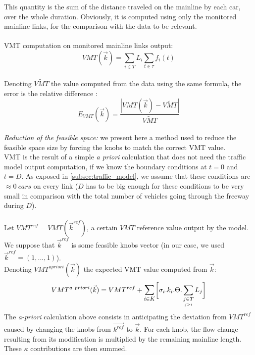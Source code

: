 This quantity is the sum of the distance traveled on the mainline by each car, over the whole duration.
Obviously, it is computed using only the monitored mainline links, for the comparison with the data to be relevant.\\
\\
VMT computation on monitored mainline links output:
\begin{equation*}
	 VMT(\vec{k})=\sum_{i\in{T}}L_{i}\sum_{t\in \tau}f_{i}(t)
\end{equation*}
\\
Denoting $\widetilde{VMT}$ the value computed from the data using the same formula, the error is the relative difference :
\begin{equation*}
	E_{VMT}(\vec{k})=\frac{|VMT(\vec{k})-\widetilde{VMT}|}{\widetilde{VMT}}
\end{equation*}
~\\
\emph{Reduction of the feasible space:} we present here a method used to reduce the feasible space size by forcing the knobs to match the correct VMT value.\\
VMT is the result of a simple \emph{a priori} calculation that does not need the traffic model output computation, if we know the boundary conditions at $t=0$ and $t=D$. As exposed in \ref{subsec:traffic_model}, we assume that these conditions are $\approx 0\ cars$ on every link ($D$ has to be big enough for these conditions to be very small in comparison with the total number of vehicles going through the freeway during $D$).\\
\\
Let $VMT^{ref}=VMT(\vec{k}^{ref})$, a certain $VMT$ reference value output by the model. We suppose that $\vec{k}^{ref}$ is some feasible knobs vector (in our case, we used $\vec{k}^{ref}=(1,...,1)$).\\
Denoting $VMT^{a priori}(\vec{k})$ the expected VMT value computed from $\vec{k}$:\\
\begin{equation}
	\label{eq:TVMapriori}
	VMT^{a\ priori}(\vec{k})=VMT^{ref}+\mathlarger{\sum\limits_{i\in K}}\biggl[\sigma_{i}.k_{i}.\Theta.	\sum\limits_{\underset{j>i}{j\in T}}L_{j}\biggr]
\end{equation}	
The \emph{a-priori} calculation above consists in anticipating the deviation from $VMT^{ref}$ caused by changing the knobs from $\vec{k^{ref}}$ to $\vec{k}$. For each knob, the flow change resulting from its modification is multiplied by the remaining mainline length. These $\kappa$ contributions are then summed.\\

